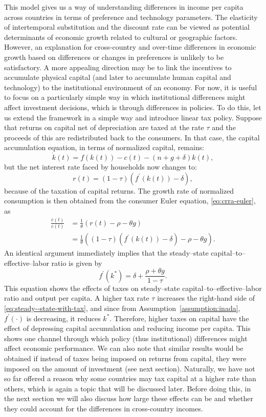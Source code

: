 \documentclass[\topdir/lecture\_notes.tex]{subfiles}
\begin{document}
This model gives us a way of understanding differences in income per capita across countries in terms of preference and technology parameters. The elasticity of intertemporal substitution and the discount rate can be viewed as potential determinants of economic growth related to cultural or geographic factors. However, an explanation for cross-country and over-time differences in economic growth based on differences or changes in preferences is unlikely to be satisfactory. A more appealing direction may be to link the incentives to accumulate physical capital (and later to accumulate human capital and technology) to the institutional environment of an economy. For now, it is useful to focus on a particularly simple way in which institutional differences might affect investment decisions, which is through differences in policies. To do this, let us extend the framework in a simple way and introduce
linear tax policy. Suppose that returns on capital net of depreciation are taxed at the rate $\tau$ and the proceeds of this are redistributed back to the consumers. In that case, the capital accumulation equation, in terms of normalized capital, remains:
\[
  \dot{k}(t)=f(k(t))-c(t)-(n+g+\delta) k(t),
\]
but the net interest rate faced by households now changes to:
\[
  r(t)=(1-\tau)\left(f^{\prime}(k(t))-\delta\right),
\]
because of the taxation of capital returns. The growth rate of normalized consumption is then obtained from the consumer Euler equation, \eqref{eq:crra-euler}, as
\[
  \begin{aligned}
    \frac{\dot{c}(t)}{c(t)} & =\frac{1}{\theta}(r(t)-\rho-\theta g)                                                    \\
                            & =\frac{1}{\theta}\left((1-\tau)\left(f^{\prime}(k(t))-\delta\right)-\rho-\theta g\right).
  \end{aligned}
\]
An identical argument immediately implies that the steady--state capital--to--effective--labor ratio is given by
\begin{equation}
  f^{\prime}\left(k^{*}\right)=\delta+\frac{\rho+\theta g}{1-\tau}.
  \label{eq:steady--state-with-tax}
\end{equation}
This equation shows the effects of taxes on steady--state capital--to--effective--labor ratio and output per capita. A higher tax rate $\tau$ increases the right-hand side of \eqref{eq:steady--state-with-tax}, and since from Assumption~\ref{assumption:inada}, $f^{\prime}(\cdot)$ is decreasing, it reduces $k^{*}$. Therefore, higher taxes on capital have the effect of depressing capital accumulation and reducing income per capita. This shows one channel through which policy (thus institutional) differences might affect economic performance. We can also note that similar results would be obtained if instead of taxes being imposed on returns from capital, they were imposed on the amount of investment (see next section). Naturally, we have not so far offered a reason why some countries may tax capital at a higher rate than others, which is again a topic that will be discussed later. Before doing this, in the next section we will also discuss how large these effects can be and whether they could account for the differences in cross-country incomes.
\end{document}
